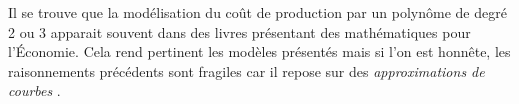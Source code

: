 Il se trouve que la modélisation du coût de production par un polynôme de degré 2 ou 3 apparait souvent dans des livres présentant des mathématiques pour l'Économie. Cela rend pertinent les modèles présentés mais si l'on est honnête, les raisonnements précédents sont fragiles car il repose sur des \emph{\og approximations de courbes \fg}.